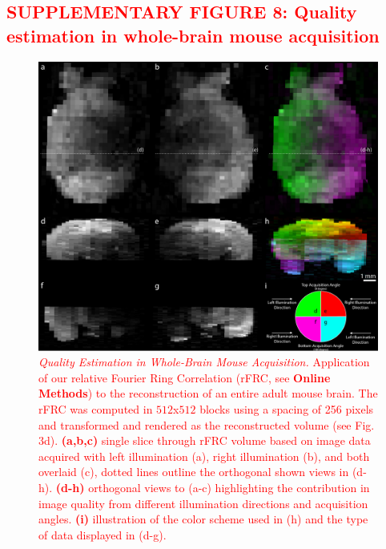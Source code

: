 \documentclass[]{spie}  %
\def\red{\textcolor{red}}
\begin{document}
\subsection*{\red{SUPPLEMENTARY FIGURE 8: Quality estimation in whole-brain mouse acquisition}}
\vspace{1mm}
\begin{figure}[h!]
\includegraphics[width=\textwidth]{rFRC_brain.jpg}
\vspace{-2.0mm}
\caption{\hspace{-0.5mm} \red{\emph{Quality Estimation in Whole-Brain Mouse Acquisition.} Application of our relative Fourier Ring Correlation (rFRC, see \textbf{Online Methods}) to the reconstruction of an entire adult mouse brain. The rFRC was computed in $512$x$512$ blocks using a spacing of 256 pixels and transformed and rendered as the reconstructed volume (see Fig. 3d). \textbf{(a,b,c)} single slice through rFRC volume based on image data acquired with left illumination (a), right illumination (b), and both overlaid (c), dotted lines outline the orthogonal shown views in (d-h). \textbf{(d-h)} orthogonal views to (a-c) highlighting the contribution in image quality from different illumination directions and acquisition angles. \textbf{(i)} illustration of the color scheme used in (h) and the type of data displayed in (d-g).
}}
\label{fig:sup-rfrc-brain}
\end{figure}

\pagebreak
\end{document}
